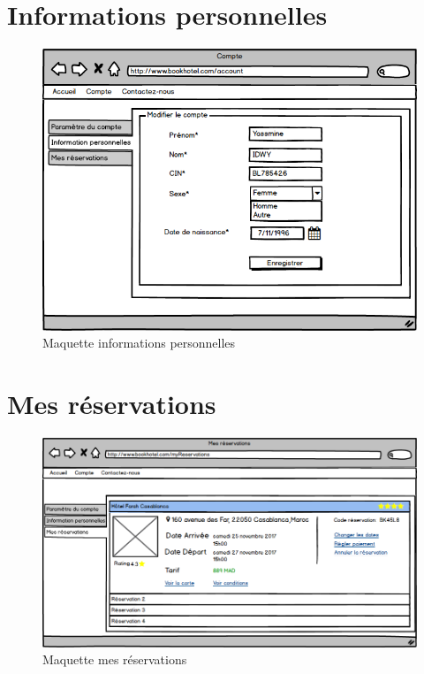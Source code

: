 \documentclass[12pt,a4paper]{report}
\begin{document}
	\newpage
	\section{Informations personnelles}
	\vspace{2cm}
	\begin{figure}[!hbtp]
		\centering
		\includegraphics[scale=0.5]{./graphics/7.png}
		\caption{Maquette informations personnelles}
	\end{figure}

	\newpage
	\section{Mes réservations}
	\begin{figure}[!hbtp]
		\centering
		\includegraphics[scale=0.4]{./graphics/4.png}
		\caption{Maquette mes réservations}
	\end{figure}
	
\end{document}
